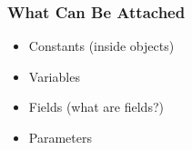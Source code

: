 \begin{frame}

\frametitle{What Can Be Attached}

\begin{itemize}

\item Constants (inside objects)

\item Variables

\item Fields (what are fields?)

\item Parameters

\end{itemize}

\end{frame}
